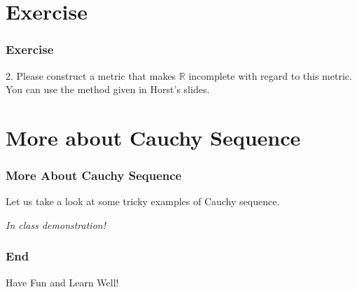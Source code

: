 \documentclass[12pt, t]{beamer}
\renewcommand{\emph}[1]{{\color{Turquoise3}\textsl{#1}}}
\begin{document}
\section{Exercise}
\begin{frame}
    \frametitle{Exercise}
2. Please construct a metric that makes $\mathbb{R}$ incomplete with regard to this metric. You can use the method given in 
Horst's slides.
\end{frame}

\section{More about Cauchy Sequence}
\begin{frame}
    \frametitle{More About Cauchy Sequence}
Let us take a look at some tricky examples of Cauchy sequence.\\
\vspace{5em}
\begin{center}
    \Large \emph{In class demonstration!}
\end{center}
\end{frame}

\begin{frame}
    \frametitle{End}
    \vspace{2cm}
    \Huge \center  Have Fun and Learn Well!
\end{frame}
\end{document}

